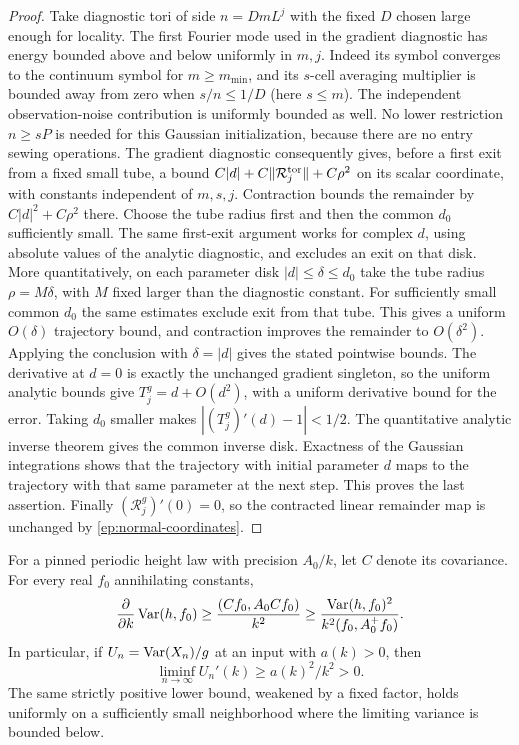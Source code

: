 \begin{proof}
Take diagnostic tori of side $n=DmL^j$ with the fixed $D$ chosen
large enough for locality.  The first Fourier mode used in the gradient
diagnostic has energy bounded above and below uniformly in $m,j$.
Indeed its symbol converges to the continuum symbol for
$m\ge m_{\min}$, and its $s$-cell averaging multiplier is bounded
away from zero when $s/n\le1/D$ (here $s\le m$).
The independent observation-noise contribution is uniformly bounded
as well.  No lower restriction $n\ge sP$ is needed for this Gaussian
initialization, because there are no entry sewing operations.
The gradient diagnostic consequently gives, before a first exit from
a fixed small tube, a bound $C|d|+C\|\mathcal R_j^{\rm tor}\|+C\rho^2$
on its scalar coordinate, with constants independent of $m,s,j$.
Contraction bounds the remainder by $C|d|^2+C\rho^2$ there.
Choose the tube radius first and then the common $d_0$ sufficiently
small.  The same first-exit argument works for complex $d$, using
absolute values of the analytic diagnostic, and excludes an exit
on that disk.  More quantitatively, on each parameter disk
$|d|\le\delta\le d_0$ take the tube radius $\rho=M\delta$, with
$M$ fixed larger than the diagnostic constant.  For sufficiently
small common $d_0$ the same estimates exclude exit from that tube.
This gives a uniform $O(\delta)$ trajectory bound, and contraction
improves the remainder to $O(\delta^2)$.  Applying the conclusion
with $\delta=|d|$ gives the stated pointwise bounds.
The derivative at $d=0$ is exactly the unchanged gradient
singleton, so the uniform analytic bounds give
$T_j^g=d+O(d^2)$, with a uniform derivative bound for the error.
Taking $d_0$ smaller makes $|(T_j^g)'(d)-1|<1/2$.
The quantitative analytic inverse theorem gives the common
inverse disk.  Exactness of the Gaussian integrations shows
that the trajectory with initial parameter $d$ maps to the
trajectory with that same parameter at the next step.
This proves the last assertion.  Finally
$(\mathcal R_j^g)'(0)=0$, so the contracted linear remainder
map is unchanged by \eqref{ep:normal-coordinates}.
\end{proof}

\begin{lemma}
\label{ep:finite-response}
For a pinned periodic height law with precision $A_0/k$,
let $C$ denote its covariance.  For every real $f_0$
annihilating constants,
\begin{equation}\label{ep:response-bound}
 \frac{\partial}{\partial k}\operatorname{Var}(h,f_0)
 \ge\frac{(Cf_0,A_0Cf_0)}{k^2}
 \ge\frac{\operatorname{Var}(h,f_0)^2}{k^2(f_0,A_0^+f_0)}.
\end{equation}
In particular, if $U_n=\operatorname{Var}(X_n)/g$ at an input with
$a(k)>0$, then
\begin{equation}\label{ep:positive-physical-response}
 \liminf_{n\to\infty}U_n'(k)\ge a(k)^2/k^2>0.
\end{equation}
The same strictly positive lower bound, weakened by a fixed
factor, holds uniformly on a sufficiently small neighborhood
where the limiting variance is bounded below.
\end{lemma}

